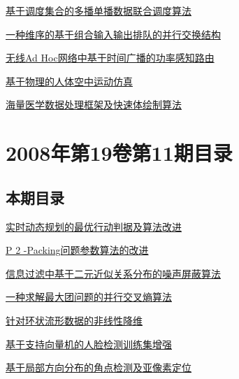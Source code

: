 \documentclass[a4paper]{article}
\begin{document}
\href{http://www.jos.org.cn/ch/reader/download_pdf.aspx?file_no=20081210&year_id=2008&quarter_id=12&falg=1}{基于调度集合的多播单播数据联合调度算法}

\href{http://www.jos.org.cn/ch/reader/download_pdf.aspx?file_no=20081211&year_id=2008&quarter_id=12&falg=1}{一种维序的基于组合输入输出排队的并行交换结构}

\href{http://www.jos.org.cn/ch/reader/download_pdf.aspx?file_no=20081212&year_id=2008&quarter_id=12&falg=1}{无线Ad Hoc网络中基于时间广播的功率感知路由}

\href{http://www.jos.org.cn/ch/reader/download_pdf.aspx?file_no=20081213&year_id=2008&quarter_id=12&falg=1}{基于物理的人体空中运动仿真}

\href{http://www.jos.org.cn/ch/reader/download_pdf.aspx?file_no=20081214&year_id=2008&quarter_id=12&falg=1}{海量医学数据处理框架及快速体绘制算法}


\section{\textbf{2008年第19卷第11期目录}}
\subsection{本期目录}
\href{http://www.jos.org.cn/ch/reader/download_pdf.aspx?file_no=20081109&year_id=2008&quarter_id=11&falg=1}{实时动态规划的最优行动判据及算法改进}

\href{http://www.jos.org.cn/ch/reader/download_pdf.aspx?file_no=20081110&year_id=2008&quarter_id=11&falg=1}{P 2 -Packing问题参数算法的改进}

\href{http://www.jos.org.cn/ch/reader/download_pdf.aspx?file_no=20081111&year_id=2008&quarter_id=11&falg=1}{信息过滤中基于二元近似关系分布的噪声屏蔽算法}

\href{http://www.jos.org.cn/ch/reader/download_pdf.aspx?file_no=20081112&year_id=2008&quarter_id=11&falg=1}{一种求解最大团问题的并行交叉熵算法}

\href{http://www.jos.org.cn/ch/reader/download_pdf.aspx?file_no=20081113&year_id=2008&quarter_id=11&falg=1}{针对环状流形数据的非线性降维}

\href{http://www.jos.org.cn/ch/reader/download_pdf.aspx?file_no=20081114&year_id=2008&quarter_id=11&falg=1}{基于支持向量机的人脸检测训练集增强}

\href{http://www.jos.org.cn/ch/reader/download_pdf.aspx?file_no=20081115&year_id=2008&quarter_id=11&falg=1}{基于局部方向分布的角点检测及亚像素定位}
\end{document}
